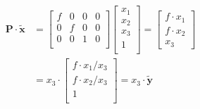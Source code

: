 \documentclass[12pt]{report}
\begin{document}
\begin{equation*}
\begin{split}
\mathbf{P}\cdot\mathbf{\tilde{x}}&=
\begin{bmatrix}
f & 0 & 0 & 0\\
0 & f & 0 & 0\\
0 & 0 & 1 & 0\\
\end{bmatrix}\begin{bmatrix}x_1\\x_2\\x_3\\1\\\end{bmatrix}
=\begin{bmatrix}
f\cdot x_1\\
f\cdot x_2\\
x_3
\end{bmatrix}\\
&=
x_3\cdot\begin{bmatrix}
f\cdot x_1/x_3\\
f\cdot x_2/x_3\\
1\\
\end{bmatrix}
=x_3\cdot\mathbf{\tilde{y}}
\end{split}
\end{equation*} 
\end{document}
